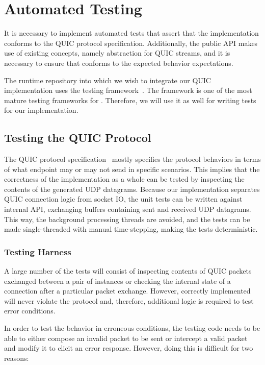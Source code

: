 \section{Automated Testing}

It is necessary to implement automated tests that assert that the implementation conforms to the
QUIC protocol specification. Additionally, the public API makes use of existing concepts, namely
 abstraction for QUIC streams, and it is necessary to ensure that \QuicStream{}
conforms to the expected  behavior expectations.

The \dotnet{} runtime repository into which we wish to integrate our QUIC implementation uses the
\xUnit{} testing framework~\cite{xunit}. The \xUnit{} framework is one of the most mature testing
frameworks for \dotnet{}. Therefore, we will use it as well for writing tests for our
implementation.

\subsection{Testing the QUIC Protocol}

The QUIC protocol specification~\cite{draft-ietf-quic-transport} mostly specifies the protocol
behaviors in terms of what endpoint may or may not send in specific scenarios. This implies that the
correctness of the implementation as a whole can be tested by inspecting the contents of the
generated UDP datagrams. Because our implementation separates QUIC connection logic from socket IO,
the unit tests can be written against internal \QuicConnection{} API, exchanging buffers containing
sent and received UDP datagrams. This way, the background processing threads are avoided, and the
tests can be made single-threaded with manual time-stepping, making the tests deterministic.

\subsubsection{Testing Harness}

A large number of the tests will consist of inspecting contents of QUIC packets exchanged between a
pair of \QuicConnection{} instances or checking the internal state of a connection after a
particular packet exchange. However, correctly implemented \QuicConnection{} will never violate the
protocol and, therefore, additional logic is required to test error conditions.

In order to test the behavior in erroneous conditions, the testing code needs to be able to either
compose an invalid packet to be sent or intercept a valid packet and modify it to elicit an error
response. However, doing this is difficult for two reasons:


